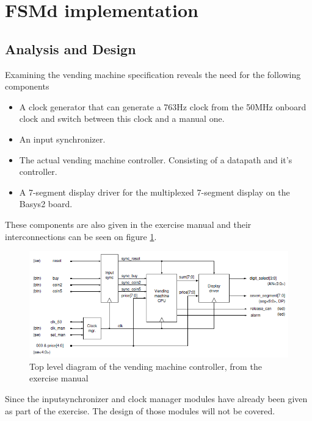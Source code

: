 \section{FSMd implementation}
\subsection{Analysis and Design}
Examining the vending machine specification reveals the need for the following components

\begin{itemize}
    \item A clock generator that can generate a 763Hz clock from the 50MHz onboard clock and switch between this clock and a manual one.
    \item An input synchronizer.
    \item The actual vending machine controller. Consisting of a datapath and it's controller.
    \item A 7-segment display driver for the multiplexed 7-segment display on the Basys2 board.
\end{itemize}

These components are also given in the exercise manual and their interconnections can be seen on figure \ref{vending_top}.

\begin{figure}[h]
    \center
    \includegraphics{pictures/vending_top.png}
    \caption{Top level diagram of the vending machine controller, from the exercise manual}
    \label{vending_top}
\end{figure}

Since the inputsynchronizer and clock manager modules have already been given as part of the exercise. The design of those modules will not be covered.

